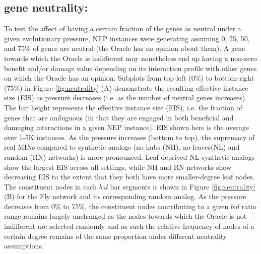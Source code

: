 \subsection{gene neutrality:}\label{neutrality}
To test the affect of having a certain fraction of the genes as neutral under a given evolutionary pressure, NEP instances were generating assuming 0, 25, 50, and 75\% of genes are neutral (the Oracle has no opinion about them). A gene towards which the Oracle is indifferent may nonetheless end up having a non-zero benefit and/or damage value depending on its interaction profile with other genes on which the Oracle has an opinion. Subplots from top-left (0\%) to bottom-right (75\%) in  Figure \ref{fig:neutrality} (A) demonstrate the resulting effective instance size (EIS) as pressure decreases (i.e. as the number of neutral genes increases). The bar height represents the effective instance size (EIS), i.e. the fraction of genes that are ambiguous (in that they are engaged in both beneficial and damaging interactions in a given NEP instance). EIS shown here is the average over 1-5K instances. As the pressure increases (bottom to top), the supremacy of real MINs compared to synthetic analogs (no-hubs (NH), no-leaves(NL) and random (RN) networks) is more pronounced. Leaf-deprived NL synthetic analogs show the largest EIS across all settings, while NH and RN networks show decreasing EIS to the extent that they both have more smaller-degree leaf nodes. The constituent nodes in each $b$:$d$ bar segments is shown in Figure  \ref{fig:neutrality} (B) for the  Fly network and its corresponding random analog. As the pressure decreases from 0\% to 75\%, the constituent nodes contributing to a given $b$:$d$ ratio range remains largely unchanged as the nodes towards which the Oracle is not indifferent are selected randomly and as such the relative frequency of nodes of a certain degree remains of the same proportion under different neutrality assumptions.
